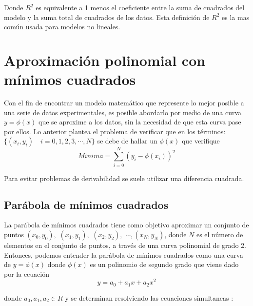 \documentclass[11pt,letterpaper]{article}
\begin{document}
Donde $R^2$ es equivalente a 1 menos el coeficiente entre la suma de cuadrados del modelo y la suma total de cuadrados de los datos. Esta definición de $R^2$ es la mas común usada para modelos no lineales.


\section{Aproximación polinomial con mínimos cuadrados}
Con el fin de encontrar un modelo matemático que represente lo mejor posible a una serie de datos experimentales, es posible abordarlo por medio de una curva $y=\phi(x)$ que se aproxime a los datos, sin la necesidad de que esta curva pase por ellos.
Lo anterior plantea el problema de verificar que en los términos:
$\{(x_i, y_i)\quad i = 0,1,2,3, \cdots, N\} $ se debe de hallar un $\phi(x)$ que verifique
\begin{equation}\label{equation:minima}
Minima = \sum_{i=0}^{N} (y_i - \phi(x_i))^2
\end{equation}


Para evitar problemas de derivabilidad se suele utilizar una diferencia cuadrada. \cite{binomiosScribd}
\subsection{Parábola de mínimos cuadrados}
La parábola de mínimos cuadrados tiene como objetivo aproximar un conjunto de puntos 
$(x_0, y_0),$ $(x_1, y_1),$ $ (x_2, y_2),$ $ \cdots , (x_N, y_N)$, donde $N$ es el número de elementos en el conjunto de puntos, 
a través de una curva polinomial de grado 2. Entonces, podemos entender la parábola de mínimos cuadrados como una curva de $y=\phi(x)$ donde $\phi(x)$ es un polinomio de segundo grado que viene dado por la ecuación
\begin{equation}\label{equation:parab-eq}
y = a_0 + a_1 x + a_2 x^2  
\end{equation}

donde $a_0, a_1, a_2 \in R$ y se determinan resolviendo las ecuaciones simultaneas : 
\end{document}
